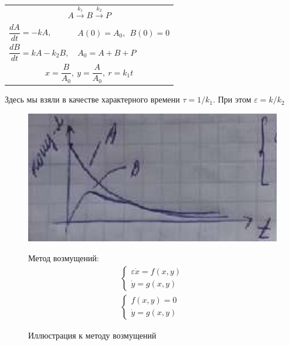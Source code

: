 \begin{lecture}
\begin{lecSection}
		\begin{center}\begin{tabular}{ll}
			\multicolumn{2}{c}{$ A \xrightarrow{k_1} B \xrightarrow{k_2} P $}  \\
			$ \dfrac { d A } { d t } = - k A, $ & $ A(0) = A_0, ~~ B(0) = 0 $ \\
			$ \dfrac { d B } { d t } = k A - k_2 B, $ & $ A_0 = A + B + P $ \\
			\multicolumn{2}{c}{$ x = \dfrac{B}{A_0}, ~ y = \dfrac{A}{A_0}, ~ r = k_1 t $}
		\end{tabular}\end{center}
		Здесь мы взяли в качестве характерного времени $ \tau = 1/k_1 $. При этом $ \varepsilon = k/k_2 $
		
		\begin{figure} %
		\begin{minipage}{0.48\linewidth}
			\centering\includegraphics[width=\linewidth]{lecture_12/vozm1}
			\caption{Иллюстрация к методу возмущений}
			\label{fig:12:vozm_illustration}
		\end{minipage}
		\begin{minipage}{0.48\linewidth}
			\centering Метод возмущений:
			\begin{gather*}
				\begin{cases}
					\varepsilon \dot{x} = f (x, y) \\
					\dot{y} = g (x, y)
				\end{cases} \\
				\begin{cases}
					f(x, y) = 0 \\
					\dot{y} = g(x, y)
				\end{cases}
			\end{gather*}
		\end{minipage}
		\end{figure}

\end{lecSection}
\end{lecture}
